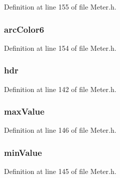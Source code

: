 Definition at line 155 of file Meter.\+h.

\hypertarget{struct_m_e_t_e_r_aaacd0d38be129470d8bf48715356357e}{}
\subsubsection[{arc\+Color6}]{ arc\+Color6}\label{struct_m_e_t_e_r_aaacd0d38be129470d8bf48715356357e}


Definition at line 154 of file Meter.\+h.

\hypertarget{struct_m_e_t_e_r_abeffaf353197a8a64fba6707b68ce0be}{}
\subsubsection[{hdr}]{ hdr}\label{struct_m_e_t_e_r_abeffaf353197a8a64fba6707b68ce0be}


Definition at line 142 of file Meter.\+h.

\hypertarget{struct_m_e_t_e_r_a199f0de6619d97659f45ad4f728819f7}{}
\subsubsection[{max\+Value}]{ max\+Value}\label{struct_m_e_t_e_r_a199f0de6619d97659f45ad4f728819f7}


Definition at line 146 of file Meter.\+h.

\hypertarget{struct_m_e_t_e_r_a2ccfd15204020ea8bb6fd3098ba8b241}{}
\subsubsection[{min\+Value}]{ min\+Value}\label{struct_m_e_t_e_r_a2ccfd15204020ea8bb6fd3098ba8b241}


Definition at line 145 of file Meter.\+h.

